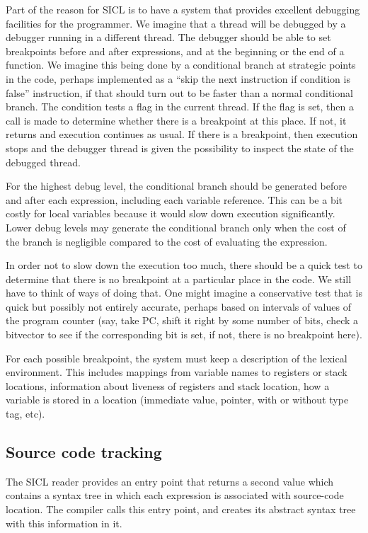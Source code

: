 \documentclass{article}
\begin{document}
Part of the reason for SICL is to have a system that provides
excellent debugging facilities for the programmer.  We imagine that a
thread will be debugged by a debugger running in a different thread.
The debugger should be able to set breakpoints before and after
expressions, and at the beginning or the end of a function.  
We imagine this being done by a conditional branch at strategic points
in the code, perhaps implemented as a ``skip the next instruction if
condition is false'' instruction, if that should turn out to be faster
than a normal conditional branch.  The condition tests a flag in the
current thread.  If the flag is set, then a call is made to determine
whether there is a breakpoint at this place.  If not, it returns and
execution continues as usual.  If there is a breakpoint, then
execution stops and the debugger thread is given the possibility to
inspect the state of the debugged thread. 

For the highest debug level, the conditional branch should be
generated before and after each expression, including each variable
reference.  This can be a bit costly for local variables because it
would slow down execution significantly.  Lower debug levels may
generate the conditional branch only when the cost of the branch is
negligible compared to the cost of evaluating the expression. 

In order not to slow down the execution too much, there should be a
quick test to determine that there is no breakpoint at a particular
place in the code.  We still have to think of ways of doing that.  One
might imagine a conservative test that is quick but possibly not
entirely accurate, perhaps based on intervals of values of the program
counter (say, take PC, shift it right by some number of bits, check a
bitvector to see if the corresponding bit is set, if not, there is no
breakpoint here). 

For each possible breakpoint, the system must keep a description of
the lexical environment.  This includes mappings from variable names
to registers or stack locations, information about liveness of
registers and stack location, how a variable is stored in a location
(immediate value, pointer, with or without type tag, etc). 

\subsection{Source code tracking}

The SICL reader provides an entry point that returns a second value
which contains a syntax tree in which each expression is associated
with source-code location.  The compiler calls this entry point, and
creates its abstract syntax tree with this information in it.  
\end{document}
